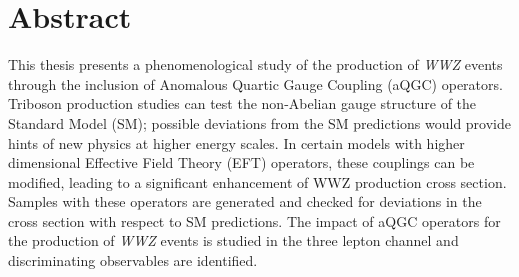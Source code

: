 \chapter*{Abstract}


This thesis presents a phenomenological study of the production of \textit{WWZ} events through the inclusion of Anomalous Quartic Gauge Coupling (aQGC) operators. Triboson production studies can test the non-Abelian gauge structure of the Standard Model (SM); possible deviations from the SM predictions would provide hints of new physics at higher energy scales. In certain models with higher dimensional Effective Field Theory (EFT) operators, these couplings can be modified, leading to a significant enhancement of WWZ production cross section. Samples with these operators are generated and checked for deviations in the cross section with respect to SM predictions. The impact of aQGC operators for the production of \textit{WWZ} events is studied in the three lepton channel and discriminating observables are identified. 
